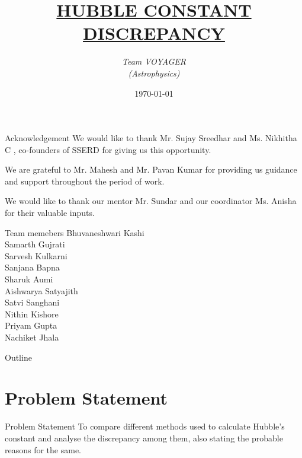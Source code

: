 \documentclass[aspectratio=169]{beamer}                    %
\title{\LARGE{\underline{\textbf {HUBBLE CONSTANT DISCREPANCY}}}}
\author{\large{\textit{Team VOYAGER \\ (Astrophysics)}}}
\date{\today}
\begin{document}
\maketitle
    
\begin{frame}{Acknowledgement}
We would like to thank Mr. Sujay Sreedhar and Ms. Nikhitha C , co-founders of SSERD for giving us this  opportunity.

We are grateful to Mr. Mahesh and Mr. Pavan Kumar for providing us guidance and support throughout the period of work.

We would like to thank our mentor Mr. Sundar and our coordinator Ms. Anisha for their valuable inputs.
\end{frame}
\begin{frame}{Team memebers}
     \centering \large {Bhuvaneshwari Kashi\\ Samarth Gujrati \\Sarvesh Kulkarni \\ Sanjana Bapna \\ Sharuk Aumi\\ Aishwarya Satyajith\\ Satvi Sanghani\\ Nithin Kishore \\ Priyam Gupta \\ Nachiket Jhala}
\end{frame}

\begin{frame}{Outline}
    \tableofcontents
    \vfill
\end{frame}

\section{Problem Statement}
\begin{frame}[fragile]{Problem Statement}
   \large{ To compare different methods used to calculate Hubble's constant and analyse the discrepancy among them, also stating the probable reasons for the same.}
\end{frame}
\end{document}

